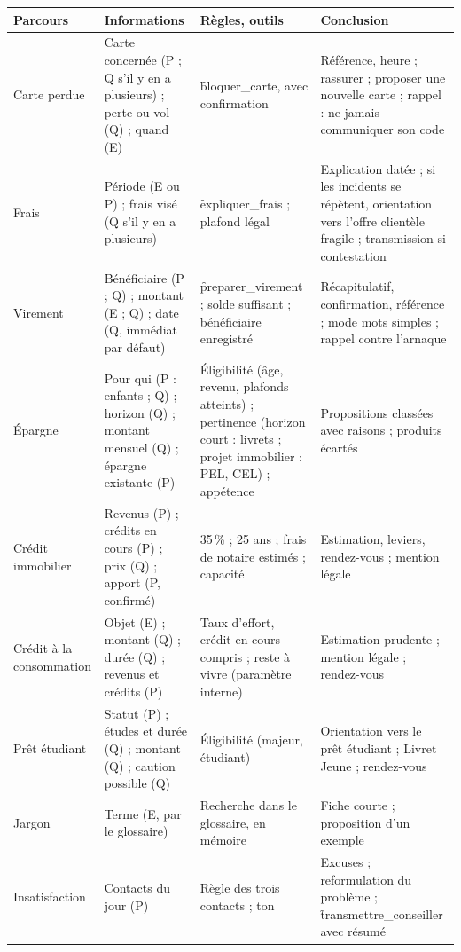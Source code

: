 \begin{center}\small
\begin{longtable}{@{}L{2.4cm} L{4.4cm} L{3.5cm} L{4.1cm}@{}}
\toprule
\textbf{Parcours} & \textbf{Informations} & \textbf{Règles, outils} & \textbf{Conclusion} \\
\midrule
\endhead
Carte perdue & Carte concernée (P ; Q s'il y en a plusieurs) ; perte ou vol (Q) ; quand (E) &
  \f{bloquer\_carte}, avec confirmation & Référence, heure ; rassurer ; proposer une nouvelle carte ;
  rappel : ne jamais communiquer son code \\
\addlinespace
Frais & Période (E ou P) ; frais visé (Q s'il y en a plusieurs) & \f{expliquer\_frais} ; plafond
  légal & Explication datée ; si les incidents se répètent, orientation vers l'offre clientèle
  fragile ; transmission si contestation \\
\addlinespace
Virement & Bénéficiaire (P ; Q) ; montant (E ; Q) ; date (Q, immédiat par défaut) &
  \f{preparer\_virement} ; solde suffisant ; bénéficiaire enregistré & Récapitulatif, confirmation,
  référence ; mode mots simples ; rappel contre l'arnaque \\
\addlinespace
Épargne & Pour qui (P : enfants ; Q) ; horizon (Q) ; montant mensuel (Q) ; épargne existante (P)
  & Éligibilité (âge, revenu, plafonds atteints) ; pertinence (horizon court : livrets ; projet
  immobilier : PEL, CEL) ; appétence & Propositions classées avec raisons ; produits écartés \\
\addlinespace
Crédit immobilier & Revenus (P) ; crédits en cours (P) ; prix (Q) ; apport (P, confirmé) & 35\,\% ;
  25 ans ; frais de notaire estimés ; capacité & Estimation, leviers, rendez-vous ; mention
  légale \\
\addlinespace
Crédit à la consommation & Objet (E) ; montant (Q) ; durée (Q) ; revenus et crédits (P) & Taux
  d'effort, crédit en cours compris ; reste à vivre (paramètre interne) & Estimation prudente ;
  mention légale ; rendez-vous \\
\addlinespace
Prêt étudiant & Statut (P) ; études et durée (Q) ; montant (Q) ; caution possible (Q) &
  Éligibilité (majeur, étudiant) & Orientation vers le prêt étudiant ; Livret Jeune ;
  rendez-vous \\
\addlinespace
Jargon & Terme (E, par le glossaire) & Recherche dans le glossaire, en mémoire & Fiche courte ;
  proposition d'un exemple \\
\addlinespace
Insatisfaction & Contacts du jour (P) & Règle des trois contacts ; ton & Excuses ; reformulation
  du problème ; \f{transmettre\_conseiller} avec résumé \\
\bottomrule
\end{longtable}
\end{center}

